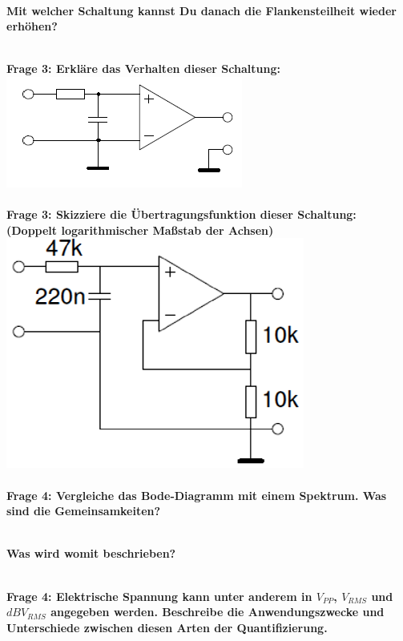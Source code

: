 \documentclass[11pt,a4paper]{scrartcl}
\begin{document}
\\

\textbf{Mit welcher Schaltung kannst Du danach die Flankensteilheit wieder erhöhen?}

\\

\textbf{Frage 3: Erkläre das Verhalten dieser Schaltung:}\\
\includegraphics{Schaltung_1.png}\\
\\

\textbf{Frage 3: Skizziere die Übertragungsfunktion dieser Schaltung:\\
(Doppelt logarithmischer Maßstab der Achsen)}\\
\includegraphics{Schaltung_2.png}\\
\\

\textbf{Frage 4: Vergleiche das Bode‐Diagramm mit einem Spektrum. Was sind die Gemeinsamkeiten?}

\\

\textbf{Was wird womit beschrieben?}

\\

\textbf{Frage 4: Elektrische Spannung kann unter anderem in $V_{PP}$, $V_{RMS}$ und $dBV_{RMS}$ angegeben werden. Beschreibe die Anwendungszwecke und Unterschiede zwischen diesen Arten der Quantifizierung.}\\
\end{document}
